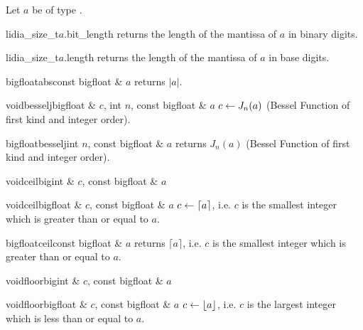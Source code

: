 
\BASIC

Let $a$ be of type .

\begin{cfcode}{lidia_size_t}{$a$.bit_length}{}
  returns the length of the mantissa of $a$ in binary digits.
\end{cfcode}

\begin{cfcode}{lidia_size_t}{$a$.length}{}
  returns the length of the mantissa of $a$ in  base digits.
\end{cfcode}

\begin{fcode}{bigfloat}{abs}{const bigfloat & $a$}
  returns $|a|$.
\end{fcode}

\begin{fcode}{void}{besselj}{bigfloat & $c$, int $n$, const bigfloat & $a$}
  $c \leftarrow J_n(a)$ (Bessel Function of first kind and integer order).
\end{fcode}

\begin{fcode}{bigfloat}{besselj}{int $n$, const bigfloat & $a$}
  returns $J_n(a)$ (Bessel Function of first kind and integer order).
\end{fcode}

\begin{fcode}{void}{ceil}{bigint & $c$, const bigfloat & $a$}
\end{fcode}
\begin{fcode}{void}{ceil}{bigfloat & $c$, const bigfloat & $a$}
  $c \leftarrow \lceil a \rceil$, i.e. $c$ is the smallest integer which is greater than or equal
  to $a$.
\end{fcode}

\begin{fcode}{bigfloat}{ceil}{const bigfloat & $a$}
  returns $\lceil a \rceil$, i.e. $c$ is the smallest integer which is greater than or equal to
  $a$.
\end{fcode}

\begin{fcode}{void}{floor}{bigint & $c$, const bigfloat & $a$}
\end{fcode}
\begin{fcode}{void}{floor}{bigfloat & $c$, const bigfloat & $a$}
  $c \leftarrow \lfloor a \rfloor$, i.e. $c$ is the largest integer which is less than or equal to
  $a$.
\end{fcode}

